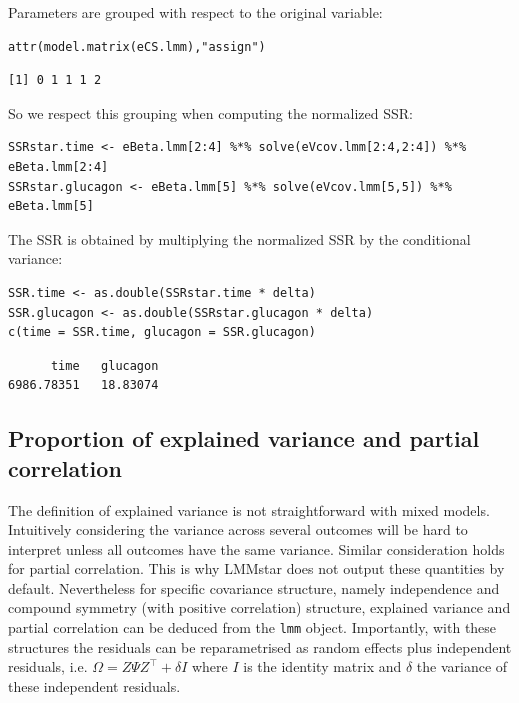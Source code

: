 \documentclass[12pt]{article}
\newcommand\Warning[1][3ex]{%
\renewcommand\stacktype{L}%
\scaleto{\stackon[1.3pt]{\color{red}$\triangle$}{\tiny\bfseries !}}{#1}%
\xspace
}
\newcommand\trans[1]{{#1}^\intercal}%
\begin{document}
Parameters are grouped with respect to the original variable:
\lstset{language=r,label= ,caption= ,captionpos=b,numbers=none}
\begin{lstlisting}
attr(model.matrix(eCS.lmm),"assign")
\end{lstlisting}

\begin{verbatim}
[1] 0 1 1 1 2
\end{verbatim}


\clearpage

So we respect this grouping when computing the normalized SSR: 
\lstset{language=r,label= ,caption= ,captionpos=b,numbers=none}
\begin{lstlisting}
SSRstar.time <- eBeta.lmm[2:4] %*% solve(eVcov.lmm[2:4,2:4]) %*% eBeta.lmm[2:4] 
SSRstar.glucagon <- eBeta.lmm[5] %*% solve(eVcov.lmm[5,5]) %*% eBeta.lmm[5] 
\end{lstlisting}
The SSR is obtained by multiplying the normalized SSR by the
conditional variance:
\lstset{language=r,label= ,caption= ,captionpos=b,numbers=none}
\begin{lstlisting}
SSR.time <- as.double(SSRstar.time * delta)
SSR.glucagon <- as.double(SSRstar.glucagon * delta)
c(time = SSR.time, glucagon = SSR.glucagon)
\end{lstlisting}
\begin{verbatim}
      time   glucagon 
6986.78351   18.83074
\end{verbatim}

\subsection{Proportion of explained variance and partial correlation}
\label{sec:orgb4a6ee1}

\Warning The definition of explained variance is not straightforward
with mixed models. Intuitively considering the variance across several
outcomes will be hard to interpret unless all outcomes have the same
variance. Similar consideration holds for partial correlation. This
is why LMMstar does not output these quantities by
default. Nevertheless for specific covariance structure, namely
independence and compound symmetry (with positive correlation)
structure, explained variance and partial correlation can be deduced
from the \texttt{lmm} object. Importantly, with these structures the
residuals can be reparametrised as random effects plus independent
residuals, i.e. \(\Omega = Z \Psi \trans{Z} + \delta I\) where
\(I\) is the identity matrix and \(\delta\) the variance of these
independent residuals.
\end{document}
